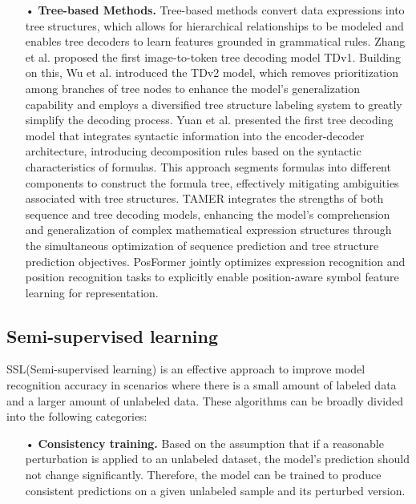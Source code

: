 \begin{itemize}
    \item [•] 
    \textbf{Tree-based Methods.}
    Tree-based methods convert data expressions into tree structures, which allows for hierarchical relationships to be modeled and enables tree decoders to learn features grounded in grammatical rules. Zhang et al.\cite{zhang2020tree} proposed the first image-to-token tree decoding model TDv1. Building on this, Wu et al.\cite{wu2022tdv2} introduced the TDv2 model, which removes prioritization among branches of tree nodes to enhance the model’s generalization capability and employs a diversified tree structure labeling system to greatly simplify the decoding process. Yuan et al.\cite{yuan2022syntax} presented the first tree decoding model that integrates syntactic information into the encoder-decoder architecture, introducing decomposition rules based on the syntactic characteristics of formulas. This approach segments formulas into different components to construct the formula tree, effectively mitigating ambiguities associated with tree structures. TAMER\cite{zhu2024tamer} integrates the strengths of both sequence and tree decoding models, enhancing the model's comprehension and generalization of complex mathematical expression structures through the simultaneous optimization of sequence prediction and tree structure prediction objectives. PosFormer\cite{guan2025posformer} jointly optimizes expression recognition and position recognition tasks to explicitly enable position-aware symbol feature learning for representation.
\end{itemize}

\subsection{Semi-supervised learning} \label{sec2.2}
SSL(Semi-supervised learning) is an effective approach to improve model recognition accuracy in scenarios where there is a small amount of labeled data and a larger amount of unlabeled data. These algorithms can be broadly divided into the following categories:

\begin{itemize}
    \item [•] 
    \textbf{Consistency training.}
    Based on the assumption that if a reasonable perturbation is applied to an unlabeled dataset, the model's prediction should not change significantly. Therefore, the model can be trained to produce consistent predictions on a given unlabeled sample and its perturbed version.
\end{itemize}

